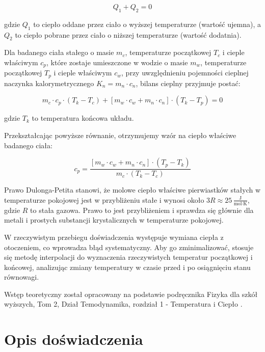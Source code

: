 \documentclass[a4paper,12pt]{article}
\begin{document}
\begin{equation}
    Q_1 + Q_2 = 0
\end{equation}

gdzie $Q_1$ to ciepło oddane przez ciało o wyższej temperaturze (wartość ujemna), a $Q_2$ to ciepło pobrane przez ciało o niższej temperaturze (wartość dodatnia).

Dla badanego ciała stałego o masie $m_c$, temperaturze początkowej $T_c$ i cieple właściwym $c_p$, które zostaje umieszczone w wodzie o masie $m_w$, temperaturze początkowej $T_p$ i cieple właściwym $c_w$, przy uwzględnieniu pojemności cieplnej naczynka kalorymetrycznego $K_n = m_n \cdot c_n$, bilans cieplny przyjmuje postać:

\begin{equation}
    m_c \cdot c_p \cdot (T_k - T_c) + [m_w \cdot c_w + m_n \cdot c_n] \cdot (T_k - T_p) = 0
\end{equation}

gdzie $T_k$ to temperatura końcowa układu.

Przekształcając powyższe równanie, otrzymujemy wzór na ciepło właściwe badanego ciała:

\begin{equation}
    c_p = \frac{[m_w \cdot c_w + m_n \cdot c_n] \cdot (T_p - T_k)}{m_c \cdot (T_k - T_c)}
\end{equation}

Prawo Dulonga-Petita stanowi, że molowe ciepło właściwe pierwiastków stałych w temperaturze pokojowej jest w przybliżeniu stałe i wynosi około $3R \approx 25\,\frac{\text{J}}{\text{mol} \cdot \text{K}}$, gdzie $R$ to stała gazowa. Prawo to jest przybliżeniem i sprawdza się głównie dla metali i prostych substancji krystalicznych w temperaturze pokojowej.

W rzeczywistym przebiegu doświadczenia występuje wymiana ciepła z otoczeniem, co wprowadza błąd systematyczny. Aby go zminimalizować, stosuje się metodę interpolacji do wyznaczenia rzeczywistych temperatur początkowej i końcowej, analizując zmiany temperatury w czasie przed i po osiągnięciu stanu równowagi.

Wstęp teoretyczny został opracowany na podstawie podręcznika Fizyka dla szkół wyższych, Tom 2, Dział Temodynamika, rozdział 1 - Temperatura i Ciepło \cite{fizyka_dla_szkół_wyższych_tom_2}.




\section{Opis doświadczenia}
\end{document}
